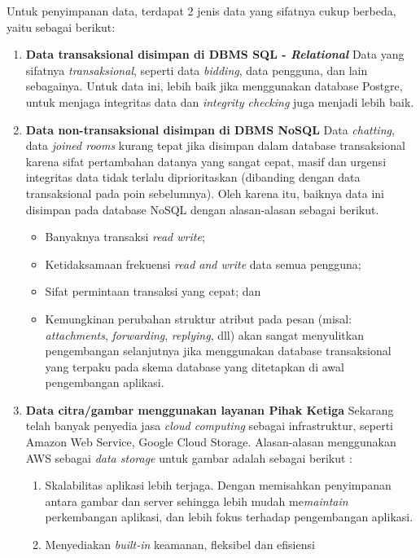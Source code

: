 	Untuk penyimpanan data, terdapat 2 jenis data yang sifatnya cukup berbeda, yaitu sebagai berikut:
	\begin{enumerate}
		\item \textbf{Data transaksional disimpan di DBMS SQL - \textit{Relational}}
		\newline
		\indent Data yang sifatnya \textit{transaksional}, seperti data \textit{bidding}, data pengguna, dan lain sebagainya.
		Untuk data ini, lebih baik jika menggunakan database Postgre, untuk menjaga integritas data dan \textit{integrity checking} juga  menjadi lebih baik.
		\item \textbf{Data non-transaksional disimpan di DBMS NoSQL}
		\newline
		\indent Data \textit{chatting}, data \textit{joined rooms} kurang tepat jika disimpan dalam database transaksional karena sifat pertambahan datanya yang sangat cepat, masif dan urgensi integritas data tidak terlalu diprioritaskan (dibanding dengan data transaksional pada poin sebelumnya). Oleh karena itu, baiknya data ini disimpan pada database NoSQL dengan alasan-alasan sebagai berikut.
		\begin{itemize} 
			\item Banyaknya transaksi \textit{read write};
			\item Ketidaksamaan frekuensi \textit{read and write} data semua pengguna;
			\item Sifat permintaan transaksi yang cepat; dan
			\item Kemungkinan perubahan struktur atribut pada pesan (misal: \textit{attachments}, \textit{forwarding}, \textit{replying}, dll) akan sangat menyulitkan pengembangan selanjutnya jika menggunakan database transaksional yang terpaku pada skema database yang ditetapkan di awal pengembangan aplikasi.
		\end{itemize} 	
		
		\item \textbf{Data citra/gambar menggunakan layanan Pihak Ketiga} \newline
		\indent Sekarang telah banyak penyedia jasa \textit{cloud computing} sebagai infrastruktur, seperti Amazon Web Service, Google Cloud Storage. Alasan-alasan menggunakan AWS sebagai \textit{data storage} untuk gambar adalah sebagai berikut :
		\begin{enumerate}[noitemsep,topsep=0pt]
			\item Skalabilitas aplikasi lebih terjaga. 
			\newline Dengan memisahkan penyimpanan antara gambar dan server sehingga lebih mudah me\textit{maintain} perkembangan aplikasi, dan lebih fokus terhadap pengembangan aplikasi.
			\item Menyediakan \textit{built-in} keamanan, fleksibel dan efisiensi \cite{wikipedia_amazon_2016}
		\end{enumerate}
		

\end{enumerate}
